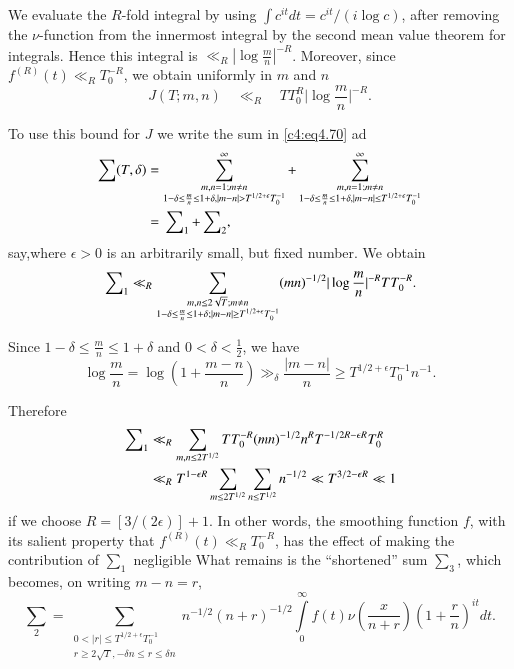 We evaluate the $R$-fold integral by using $\int c^{it} dt = c^{it}/(i
\log c)$, after removing the $\nu$-function from the innermost
integral by the second mean value theorem for integrals. Hence this
integral is $\ll_R |\log \frac{m}{n}|^{-R}$. Moreover, since
$f^{(R)}(t) \ll_R T_0^{-R}$, we obtain uniformly in $m$ and $n$
$$
J(T; m, n) \quad \ll_R \quad TT_0^R \big|\log \frac{m}{n}\big|^{-R}.
$$

To use this bound for $J$ we write the sum in \eqref{c4:eq4.70} ad
\begin{align*}
  \sum (T, \delta) & = \sum_{\substack{m, n =1; m \neq n\\ 1- \delta
      \leq \frac{m}{n} \leq 1+ \delta, |m-n| > T^{1/2+ \epsilon}
      T_0^{-1}}}^\infty + \sum^\infty_{\substack{m,n =1 ; m \neq
      n\\ 1- \delta \leq \frac{m}{n} \leq 1+ \delta, |m-n| \leq
      T^{1/2+ \epsilon}T_0^{-1}}}\\
  & = \sideset{}{_1}\sum + \sideset{}{_2}\sum,
\end{align*}
say,\pageoriginale where $\epsilon > 0$ is an arbitrarily small, but
fixed number. We obtain 
$$
\sideset{}{_1}\sum \ll_R   \sum_{\substack{m, n \leq 2 \sqrt{T}; m\neq
    n\\ 1- \delta \leq \frac{m}{n} \leq 1+ \delta; |m-n| \geq T^{1/2+
\epsilon}T_0^{-1}}} (mn)^{-1/2} |\log \frac{m}{n}|^{-R} TT_0^{-R}.
$$

Since $1- \delta \leq \frac{m}{n} \leq 1+ \delta$ and $0 < \delta <
\frac{1}{2}$, we have
$$
\log \frac{m}{n} = \log \left(1+ \frac{m-n}{n} \right) \gg_\delta
\frac{|m-n|}{n} \geq T^{1/2+ \epsilon} T^{-1}_0 n^{-1}.
$$ 

Therefore 
\begin{align*}
  \sideset{}{_1}\sum & \ll _R \sum_{m, n \leq 2 T^{1/2}} TT^{-R}_0
  (mn)^{-1/2} n^R T^{-1/2 R - \epsilon R}T^R_0\\
  & \ll_R T^{1- \epsilon R} \sum_{m \leq 2T^{1/2}} \sum_{n \leq
    T^{1/2}} n^{- 1/2} \ll T^{3/2 - \epsilon R} \ll 1
\end{align*}
if we choose $R = [3/(2\epsilon)]+1$. In other words, the smoothing
function $f$, with its salient property that $f^{(R)} (t) \ll_R
T_0^{-R}$, has the effect of making the contribution of $\sum_{1}$
negligible What remains is the ``shortened'' sum $\sum_3$, which
becomes, on writing $m- n=r$,
$$
{\sum}_2 = \sum_{\substack{0 < |r| \leq T^{1/2 + \epsilon}
    T_0^{-1}\\r \geq 2 \sqrt{T}, - \delta n \leq r \leq \delta n}}
n^{-1/2} (n+r)^{-1/2} \int\limits_0^\infty f(t) \nu
\left(\frac{x}{n+r} \right)\left(1+ \frac{r}{n} \right)^{it} dt.
$$

